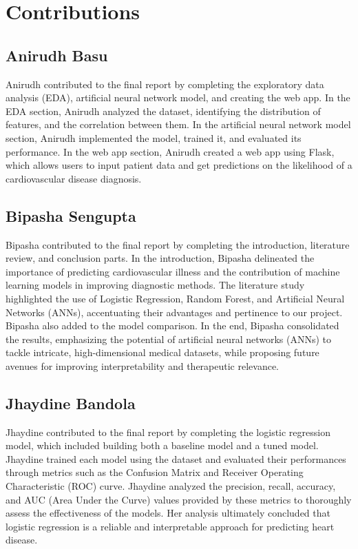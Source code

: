 \section{Contributions}

\subsection{Anirudh Basu}
Anirudh contributed to the final report by completing the exploratory data analysis (EDA), artificial neural network model, and creating the web app. In the EDA section, Anirudh analyzed the dataset, identifying the distribution of features, and the correlation between them. In the artificial neural network model section, Anirudh implemented the model, trained it, and evaluated its performance. In the web app section, Anirudh created a web app using Flask, which allows users to input patient data and get predictions on the likelihood of a cardiovascular disease diagnosis.

\subsection{Bipasha Sengupta}
Bipasha contributed to the final report by completing the introduction, literature review, and conclusion parts. In the introduction, Bipasha delineated the importance of predicting cardiovascular illness and the contribution of machine learning models in improving diagnostic methods. The literature study highlighted the use of Logistic Regression, Random Forest, and Artificial Neural Networks (ANNs), accentuating their advantages and pertinence to our project. Bipasha also added to the model comparison. In the end, Bipasha consolidated the results, emphasizing the potential of artificial neural networks (ANNs) to tackle intricate, high-dimensional medical datasets, while proposing future avenues for improving interpretability and therapeutic relevance.

\subsection{Jhaydine Bandola}
Jhaydine contributed to the final report by completing the logistic regression model, which included building both a baseline model and a tuned model. Jhaydine trained each model using the dataset and evaluated their performances through metrics such as the Confusion Matrix and Receiver Operating Characteristic (ROC) curve. Jhaydine analyzed the precision, recall, accuracy, and AUC (Area Under the Curve) values provided by these metrics to thoroughly assess the effectiveness of the models. Her analysis ultimately concluded that logistic regression is a reliable and interpretable approach for predicting heart disease.

